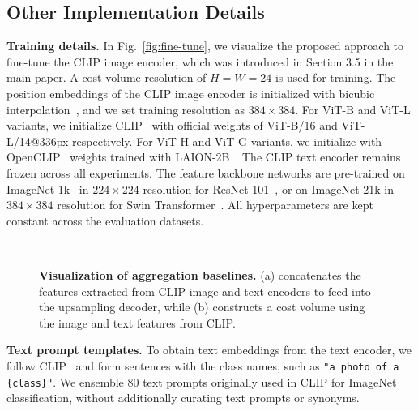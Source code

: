 \documentclass[10pt,twocolumn,letterpaper]{article}
\begin{document}
\subsection{Other Implementation Details}
\smallbreak
\noindent\textbf{Training details.}
In Fig.~\ref{fig:fine-tune}, we visualize the proposed approach to fine-tune the CLIP image encoder, which was introduced in Section 3.5 in the main paper. A cost volume resolution of $H=W=24$ is used for training. The position embeddings of the CLIP image encoder is initialized with bicubic interpolation~\cite{touvron2021training}, and we set training resolution as $384\times 384$. For ViT-B and ViT-L variants, we initialize CLIP~\cite{radford2021learning} with official weights of ViT-B/16 and ViT-L/14@336px respectively. For ViT-H and ViT-G variants, we initialize with OpenCLIP~\cite{cherti2022reproducible} weights trained with LAION-2B~\cite{schuhmann2022laion}. The CLIP text encoder remains frozen across all experiments. The feature backbone networks are pre-trained on ImageNet-1k~\cite{deng2009imagenet} in $224\times224$ resolution for ResNet-101~\cite{he2016deep}, or on ImageNet-21k in $384\times384$ resolution for Swin Transformer~\cite{liu2021swin}. All hyperparameters are kept constant across the evaluation datasets.  


\begin{figure}[t]
  \centering
  \renewcommand{\thesubfigure}{}
     \hfill
     \hfill\\

\vspace{-10pt}
\caption{\textbf{Visualization of aggregation baselines.} (a) concatenates the features extracted from CLIP image and text encoders to feed into the upsampling decoder, while (b) constructs a cost volume using the image and text features from CLIP. }
\vspace{-5pt}
  \label{fig:baseline}
\end{figure} \smallbreak
\noindent\textbf{Text prompt templates.}
To obtain text embeddings from the text encoder, we follow CLIP~\cite{radford2021learning} and form sentences with the class names, such as \texttt{"a photo of a \{class\}"}. We ensemble 80 text prompts originally used in CLIP for ImageNet classification, without additionally curating text prompts or synonyms.
\end{document}

